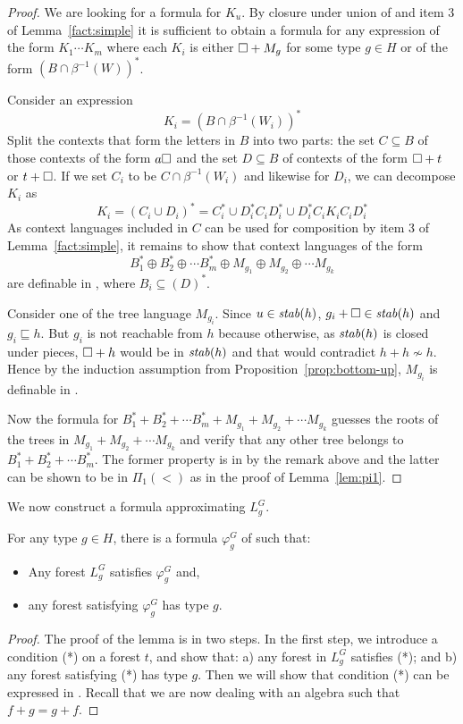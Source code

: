 \documentclass{LMCS}
\begin{document}
{\begin{proof}
  We are looking for a \Stwo formula for $K_u$. By closure under union of \Stwo
  and item 3 of Lemma~\ref{fact:simple} it is sufficient to obtain a \Stwo
  formula for any expression of the form $K_{1} \cdots K_{m}$ where each $K_i$
  is either $\Box + M_g$ for some type $g \in H$ or of the form $(B \cap
  \beta^{-1}(W))^*$.

  Consider an expression
  \[
    K_i=(B \cap \beta^{-1}(W_i))^*
  \]
 Split  the contexts that form the  letters in $B$
  into two  parts: the set $C \subseteq B$  of  those contexts of the
  form $a\Box$ and the set  $D \subseteq B$ of contexts of the form
 $\Box +t$ or $t+ \Box$. If we set $C_i$ to be $C \cap
 \beta^{-1}(W_i)$ and likewise for $D_i$, we can decompose $K_i$ as 
  \[
     K_i=(C_i \cup D_i)^*=C_i^* \cup
  D_i^*C_iD_i^* \cup D_i^*C_iK_iC_iD_i^* 
  \]
 As context
  languages included in $C$ can be used for composition by item 3 of
  Lemma~\ref{fact:simple}, it remains to show that context languages of the form
  \[
      B_1^* \oplus B_2^* \oplus \cdots B_m^* \oplus M_{g_1} \oplus M_{g_2} \oplus \cdots M_{g_k}
  \]
 are
  definable in \Stwo, where $B_i \subseteq (D)^*$.


  Consider one of the tree language $M_{g_i}$. Since $u\in \mathit{stab}(h)$, $g_i+\Box \in
  \mathit{stab}(h)$ and $g_i \sqsubseteq h$. But $g_i$ is not reachable from $h$ because
  otherwise, as $\mathit{stab}(h)$ is closed under pieces, $\Box +h$ would be in
  $\mathit{stab}(h)$ and that would contradict $h+h \not\sim h$. Hence by the induction
  assumption from Proposition~\ref{prop:bottom-up}, $M_{g_i}$ is definable in
  \Stwo.

  Now the \Stwo formula for $B_1^* + B_2^* + \cdots B_m^* + M_{g_1} + M_{g_2} +
  \cdots M_{g_k}$ guesses the roots of the trees in $M_{g_1} + M_{g_2} +
  \cdots M_{g_k}$ and verify that any other tree belongs to  $B_1^* + B_2^* +
  \cdots B_m^*$. The former property is in \Stwo by the remark above and the
  latter can be shown to be in $\Pi_1(<)$ as in the proof of Lemma~\ref{lem:pi1}.
\end{proof}

We now construct a \Stwo formula approximating $L^G_g$.

\begin{lem}\label{lemma:sigma2-forest}
  For any type $g \in H$, there is a formula  $\varphi^G_g$ of 
  \Stwo such that:
\begin{itemize}
  \item Any forest  $L^G_g$ satisfies $\varphi^G_g$ and,
\item any forest satisfying $\varphi^G_g$ has type $g$.
\end{itemize}
\end{lem}
\vspace{-.2cm}
\begin{proof}
  The proof of the lemma is in two steps.  In the first step, we
introduce a condition (*) on a forest $t$, and show that: a) any
forest in $L^G_g$ satisfies (*); and b) any forest satisfying (*) has
type $g$. Then we will show that condition (*) can be expressed in
\Stwo. Recall that we are now dealing with an algebra such that $f+g=g+f$.



\end{proof}}
\end{document}

